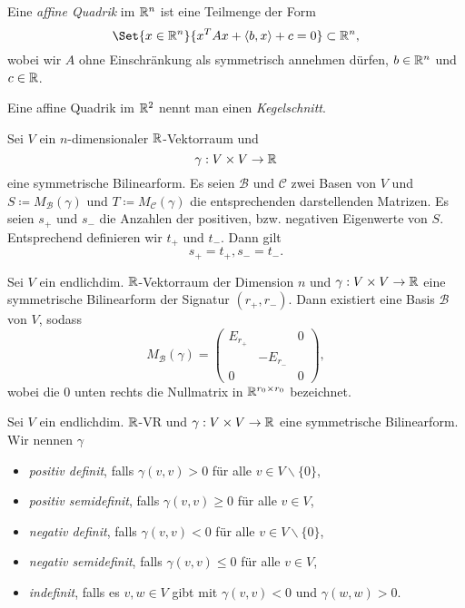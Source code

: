 \documentclass{cheat-sheet}
\newcommand{\BB}{\mathcal{B}}
\newcommand{\BC}{\mathcal{C}}
\begin{document}
\begin{defn}
  Eine \emph{affine Quadrik} im $\mathbb{R}^n$ ist eine Teilmenge der Form
  \[ \Set{ x \in \R^n }{ x^TAx + \langle b , x \rangle + c = 0 } \subset \R^n, \]
  wobei wir $A$ ohne Einschränkung als symmetrisch annehmen dürfen, $b \in \mathbb{R}^n$ und $c \in \mathbb{R}$.
\end{defn}

\begin{defn}
  Eine affine Quadrik im $\mathbb{R}^2$ nennt man einen \emph{Kegelschnitt}.
\end{defn}


\begin{satz}
  Sei $V$ ein $n$-dimensionaler $\mathbb{R}$-Vektorraum und
  \[ \gamma : V \times V \to \mathbb{R} \]
  eine symmetrische Bilinearform. Es seien $\BB$ und $\BC$ zwei Basen von $V$ und $S \coloneqq M_\BB(\gamma)$ und $T \coloneqq M_{\BC}(\gamma)$ die entsprechenden darstellenden Matrizen. Es seien $s_+$ und $s_-$ die Anzahlen der positiven, bzw. negativen Eigenwerte von $S$. Entsprechend definieren wir $t_+$ und $t_-$. Dann gilt
  \[ s_+ = t_+, s_- = t_-. \]
\end{satz}

\begin{kor}
  Sei $V$ ein endlichdim. $\mathbb{R}$-Vektorraum der Dimension $n$ und $\gamma : V \times V \to \mathbb{R}$ eine symmetrische Bilinearform der Signatur $(r_+, r_-)$. Dann existiert eine Basis $\BB$ von $V$, sodass
  \[ M_{\BB}(\gamma) = \begin{pmatrix}
  E_{r_+} && 0 \\
  & - E_{r_-} & \\
  0 && 0
  \end{pmatrix}, \]
  wobei die $0$ unten rechts die Nullmatrix in $\mathbb{R}^{r_0 \times r_0}$ bezeichnet.
\end{kor}

\begin{defn}
  Sei $V$ ein endlichdim. $\mathbb{R}$-VR und $\gamma : V \times V \to \mathbb{R}$ eine symmetrische Bilinearform. Wir nennen $\gamma$
  \begin{itemize}
    \item \emph{positiv definit}, falls $\gamma(v, v) > 0$ für alle $v \in V \backslash \{ 0 \}$,
    \item \emph{positiv semidefinit}, falls $\gamma(v, v) \ge 0$ für alle $v \in V$,
    \item \emph{negativ definit}, falls $\gamma(v, v) < 0$ für alle $v \in V \backslash \{ 0 \}$,
    \item \emph{negativ semidefinit}, falls $\gamma(v, v) \le 0$ für alle $v \in V$,
    \item \emph{indefinit}, falls es $v, w \in V$ gibt mit $\gamma(v, v) < 0$ und $\gamma(w, w) > 0$.
  \end{itemize}
\end{defn}
\end{document}
